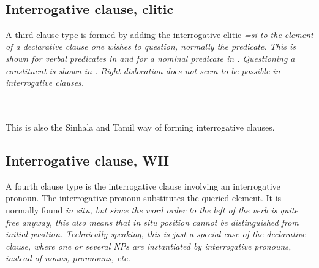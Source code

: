  \\

\subsection{Interrogative clause, clitic}\label{sec:cls:Interrogativeclauseclitic}
A third clause type is formed by adding the interrogative clitic \em =si \em to the element of a declarative clause one wishes to question,  normally the predicate. This is shown for verbal predicates in  and for a nominal predicate in . Questioning a constituent is shown in . Right dislocation does not seem to be possible in interrogative clauses.




\\ 

\\  
 

This is also the Sinhala and Tamil way of forming interrogative clauses.


\subsection{Interrogative clause, WH}\label{sec:cls:InterrogativeclauseWH}
A fourth clause type is the interrogative clause involving an interrogative pronoun.
The interrogative pronoun substitutes the queried element. It is normally found \em in situ\em, but since the word order to the left of the verb is quite free anyway, this  also means that \em in situ \em position cannot be distinguished from initial position. Technically speaking, this is just a special case of the declarative clause, where one or several NPs are instantiated by interrogative pronouns, instead of nouns, prounouns, etc.



